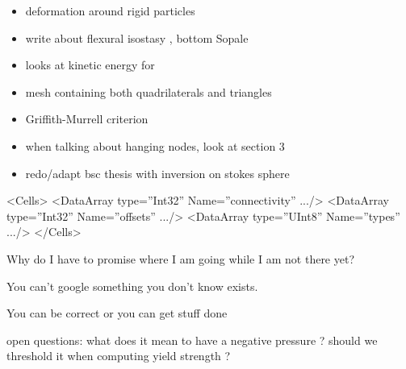 \begin{itemize}
\item deformation around rigid particles \cite{ilma93}
\item write about flexural isostasy \cite{maie12}, bottom Sopale
\item \cite{maie12} looks at kinetic energy for \cite{trab90} 
\item mesh containing both quadrilaterals and triangles \cite{anbr80}
\item Griffith-Murrell criterion \cite{brau94}
\item when talking about hanging nodes, look at \cite{bugs09} section 3
\item redo/adapt bsc thesis with inversion on stokes sphere
\end{itemize}

 <Cells>
      <DataArray type=”Int32” Name=”connectivity” .../>
      <DataArray type=”Int32” Name=”offsets” .../>
      <DataArray type=”UInt8” Name=”types” .../>
    </Cells>


Why do I have to promise where I am going while I am not there yet?

You can't google something you don't know exists.

You can be correct or you can get stuff done

open questions:
what does it mean to have a negative pressure ? should we threshold it when computing yield strength ? 
